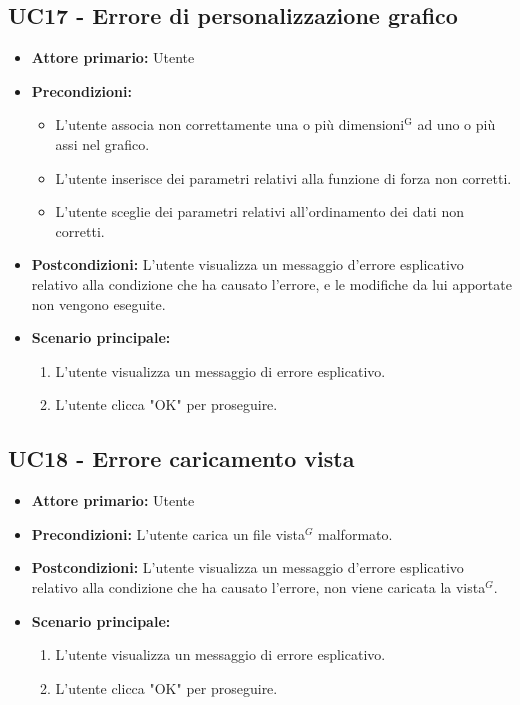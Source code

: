 \subsection{UC17 - Errore di personalizzazione grafico}
\label{sec:UC17 - Errore di personalizzazione}
\begin{itemize}
    \item \textbf{Attore primario:} Utente
    \item \textbf{Precondizioni:}
    		\begin{itemize}
    			\item L'utente associa non correttamente una o più ${\mathrm{dimensioni^{G}}}$ ad uno o più assi nel grafico.
    			\item L'utente inserisce dei parametri relativi alla funzione di forza non corretti.
    			\item L'utente sceglie dei parametri relativi all'ordinamento dei dati non corretti.
    		\end{itemize}
    \item \textbf{Postcondizioni:} L'utente visualizza un messaggio d'errore esplicativo relativo alla condizione che ha causato l'errore, e le modifiche da lui apportate non vengono eseguite.
    \item \textbf{Scenario principale:}
    \begin{enumerate}
        \item L'utente visualizza un messaggio di errore esplicativo.
        \item L'utente clicca "OK" per proseguire.
    \end{enumerate}
\end{itemize}

\subsection{UC18 - Errore caricamento vista}
\label{sec:UC18 - Errore caricamento vista}
\begin{itemize}
    \item \textbf{Attore primario:} Utente
    \item \textbf{Precondizioni:} L'utente carica un file vista$^{G}$ malformato.
    \item \textbf{Postcondizioni:} L'utente visualizza un messaggio d'errore esplicativo relativo alla condizione che ha causato l'errore, non viene caricata la vista$^{G}$.
    \item \textbf{Scenario principale:}
    \begin{enumerate}
        \item L'utente visualizza un messaggio di errore esplicativo.
        \item L'utente clicca "OK" per proseguire.
    \end{enumerate}
\end{itemize}


